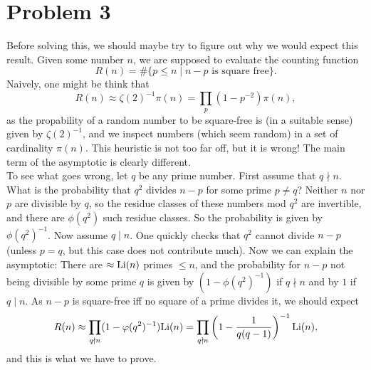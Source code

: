\documentclass[a4paper,11pt]{article}
\begin{document}
\section*{Problem 3}
Before solving this, we should maybe try to figure out why we would expect this result. 
Given some number $n$, we are supposed to evaluate the counting function
\[
    R(n) = \# \{p \leq n \mid \text{$n-p$ is square free}\}.
\]
Naively, one might be think that 
$$R(n) \approx \zeta(2)^{-1}\pi(n) = \prod_{p} (1 - p^{-2}) \pi(n),$$
as the propability of a random number to be square-free is (in a suitable sense) given by
$\zeta(2)^{-1}$, and we inspect numbers (which seem random) in a set of cardinality 
$\pi(n)$. This heuristic is not too far off, but it is wrong! The main term of the 
asymptotic is clearly different. \\ 
To see what goes wrong, let $q$ be any prime
number.  First assume that $q \nmid n$. What is the probability that $q^2$ divides $n-p$
for some prime $p\neq q$?  Neither $n$ nor $p$ are divisible by $q$, so the
residue classes of these
numbers mod $q^2$ are invertible, and there are $\phi(q^2)$ such residue
classes.  So the probability is given by $\phi(q^2)^{-1}$.  Now assume $q \mid
n$. One quickly checks that $q^2$ cannot divide $n-p$
(unless $p = q$, but this case does not contribute much). Now we can explain
the asymptotic: There are
$\approx \mathrm{Li}(n)$ primes $\leq n$, and the probability for $n-p$ not being divisible by 
some prime $q$ is given by $(1-\phi(q^2)^{-1})$ if $q \nmid n$ and by $1$ if $q \mid n$. 
As $n-p$ is square-free iff no square of a prime divides it, we should expect
\[
    R(n) \approx \prod_{q \nmid n}(1-\varphi(q^2)^{-1}) \mathrm{Li}(n) = \prod_{q
    \nmid n}\left(1-\frac1{q(q-1)}\right)^{-1} \mathrm{Li}(n),
\]
and this is what we have to prove.
\end{document}
